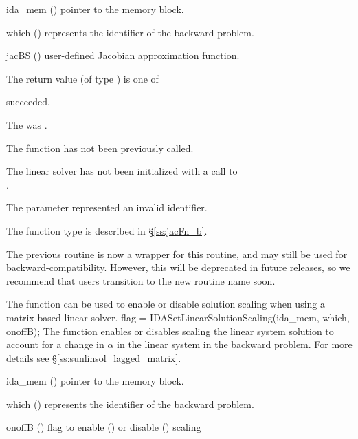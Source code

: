 {
  \begin{args}
  \item[ida\_mem] ()
    pointer to the {\idas} memory block.
  \item[which] ()
    represents the identifier of the backward problem.
  \item[jacBS] ()
    user-defined Jacobian approximation function.
  \end{args}
}
{
  The return value  (of type ) is one of
  \begin{args}
  \item[\Id{IDALS\_SUCCESS}]
     succeeded.
  \item[\Id{IDALS\_MEM\_NULL}]
    The  was .
  \item[\Id{IDALS\_NO\_ADJ}]
    The function  has not been previously called.
  \item[\Id{IDALS\_LMEM\_NULL}]
    The linear solver has not been initialized with a call to \\ \noindent
    .
  \item[\Id{IDALS\_ILL\_INPUT}]
    The parameter  represented an invalid identifier.
  \end{args}
}
{
  The function type  is described in \S\ref{ss:jacFn_b}.

  The previous routine  is now a wrapper for this
  routine, and may still be used for backward-compatibility.  However,
  this will be deprecated in future releases, so we recommend that
  users transition to the new routine name soon.
}
The function  can be used to enable or
disable solution scaling when using a matrix-based linear solver.
{
  flag = IDASetLinearSolutionScaling(ida\_mem, which, onoffB);
}
{
  The function  enables or disables scaling
  the linear system solution to account for a change in $\alpha$ in the linear
  system in the backward problem. For more details see
  \S\ref{ss:sunlinsol_lagged_matrix}.
}
{
  \begin{args}
  \item[ida\_mem] ()
    pointer to the {\idas} memory block.
  \item[which] ()
    represents the identifier of the backward problem.
  \item[onoffB] ()
    flag to enable () or disable () scaling
  \end{args}
}
